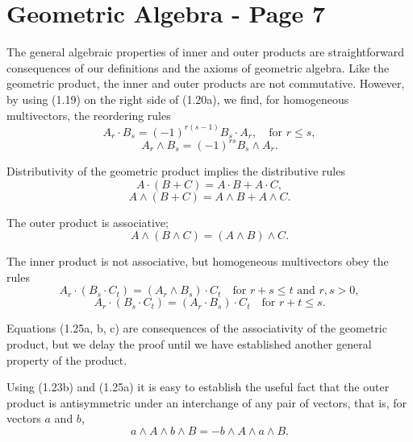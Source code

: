 \documentclass[fleqn]{scrartcl}
\numberwithin{equation}{section}
\begin{document}
\section*{Geometric Algebra - Page 7}

\noindent The general algebraic properties of inner and outer products are straightforward consequences of our definitions and the axioms of geometric algebra. Like the geometric product, the inner and outer products are not commutative. However, by using (1.19) on the right side of (1.20a), we find, for homogeneous multivectors, the reordering rules
\begin{equation}
A_r \cdot B_s = (-1)^{r(s-1)} B_s \cdot A_r, \quad \text{for } r \le s, \tag{1.23a}
\end{equation}
\begin{equation}
A_r \wedge B_s = (-1)^{rs} B_s \wedge A_r. \tag{1.23b}
\end{equation}

\noindent Distributivity of the geometric product implies the distributive rules
\begin{equation}
A \cdot (B + C) = A \cdot B + A \cdot C, \tag{1.24a}
\end{equation}
\begin{equation}
A \wedge (B + C) = A \wedge B + A \wedge C. \tag{1.24b}
\end{equation}

\noindent The outer product is associative;
\begin{equation}
A \wedge (B \wedge C) = (A \wedge B) \wedge C. \tag{1.25a}
\end{equation}

\noindent The inner product is not associative, but homogeneous multivectors obey the rules
\begin{equation}
A_r \cdot (B_s \cdot C_t) = (A_r \wedge B_s) \cdot C_t \quad \text{for } r + s \le t \text{ and } r, s > 0, \tag{1.25b}
\end{equation}
\begin{equation}
A_r \cdot (B_s \cdot C_t) = (A_r \cdot B_s) \cdot C_t \quad \text{for } r + t \le s. \tag{1.25c}
\end{equation}

\noindent Equations (1.25a, b, c) are consequences of the associativity of the geometric product, but we delay the proof until we have established another general property of the product.

\vspace{1em}
\noindent Using (1.23b) and (1.25a) it is easy to establish the useful fact that the outer product is antisymmetric under an interchange of any pair of vectors, that is, for vectors \(a\) and \(b\),
\begin{equation}
a \wedge A \wedge b \wedge B = -b \wedge A \wedge a \wedge B. \tag{1.26a}
\end{equation}
\end{document}
